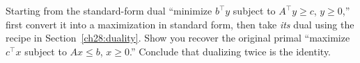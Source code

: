\begin{exercise}
Starting from the standard-form dual ``minimize $b^\top y$ subject to
$A^\top y \ge c$, $y \ge 0$,'' first convert it into a maximization in standard
form, then take \emph{its} dual using the recipe in Section~\ref{ch28:duality}.
Show you recover the original primal ``maximize $c^\top x$ subject to
$Ax \le b$, $x \ge 0$.'' Conclude that dualizing twice is the identity.
\end{exercise}
